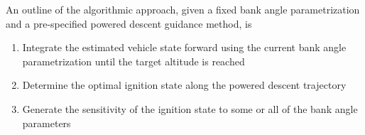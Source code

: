 \documentclass[]{article}
\begin{document}
An outline of the algorithmic approach, given a fixed bank angle parametrization and a pre-specified powered descent guidance method, is 
\begin{enumerate}
\item Integrate the estimated vehicle state forward using the current bank angle parametrization until the target altitude is reached
\item Determine the optimal ignition state along the powered descent trajectory
\item Generate the sensitivity of the ignition state to some or all of the bank angle parameters 
\end{enumerate}
%
%
%
%
%
%
%
\end{document}
